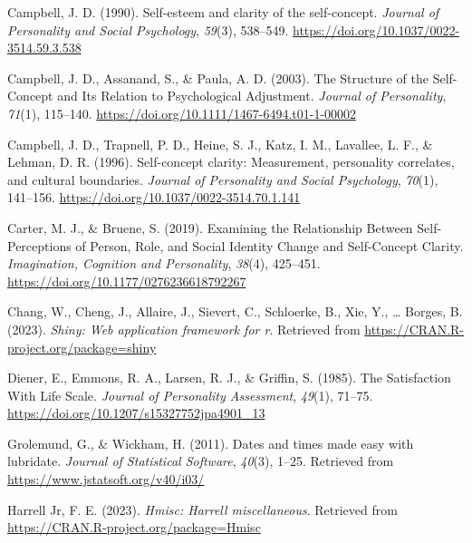 \documentclass[
  man,floatsintext]{apa6}
\newlength{\cslhangindent}
\newlength{\cslentryspacingunit} %
\newenvironment{CSLReferences}[2] %
 {%
  \setlength{\parindent}{0pt}
  \ifodd #1
  \let\oldpar\par
  \def\par{\hangindent=\cslhangindent\oldpar}
  \fi
  \setlength{\parskip}{#2\cslentryspacingunit}
 }%
 {}
\begin{document}
\begin{CSLReferences}{1}{0}
\leavevmode{}%
Campbell, J. D. (1990). Self-esteem and clarity of the self-concept. \emph{Journal of Personality and Social Psychology}, \emph{59}(3), 538--549. \url{https://doi.org/10.1037/0022-3514.59.3.538}

\leavevmode{}%
Campbell, J. D., Assanand, S., \& Paula, A. D. (2003). The {Structure} of the {Self-Concept} and {Its Relation} to {Psychological Adjustment}. \emph{Journal of Personality}, \emph{71}(1), 115--140. \url{https://doi.org/10.1111/1467-6494.t01-1-00002}

\leavevmode{}%
Campbell, J. D., Trapnell, P. D., Heine, S. J., Katz, I. M., Lavallee, L. F., \& Lehman, D. R. (1996). Self-concept clarity: {Measurement}, personality correlates, and cultural boundaries. \emph{Journal of Personality and Social Psychology}, \emph{70}(1), 141--156. \url{https://doi.org/10.1037/0022-3514.70.1.141}

\leavevmode{}%
Carter, M. J., \& Bruene, S. (2019). Examining the {Relationship Between Self-Perceptions} of {Person}, {Role}, and {Social Identity Change} and {Self-Concept Clarity}. \emph{Imagination, Cognition and Personality}, \emph{38}(4), 425--451. \url{https://doi.org/10.1177/0276236618792267}

\leavevmode{}%
Chang, W., Cheng, J., Allaire, J., Sievert, C., Schloerke, B., Xie, Y., \ldots{} Borges, B. (2023). \emph{Shiny: Web application framework for r}. Retrieved from \url{https://CRAN.R-project.org/package=shiny}

\leavevmode{}%
Diener, E., Emmons, R. A., Larsen, R. J., \& Griffin, S. (1985). The {Satisfaction With Life Scale}. \emph{Journal of Personality Assessment}, \emph{49}(1), 71--75. \url{https://doi.org/10.1207/s15327752jpa4901_13}

\leavevmode{}%
Grolemund, G., \& Wickham, H. (2011). Dates and times made easy with {lubridate}. \emph{Journal of Statistical Software}, \emph{40}(3), 1--25. Retrieved from \url{https://www.jstatsoft.org/v40/i03/}

\leavevmode{}%
Harrell Jr, F. E. (2023). \emph{Hmisc: Harrell miscellaneous}. Retrieved from \url{https://CRAN.R-project.org/package=Hmisc}


\end{CSLReferences}
\end{document}
